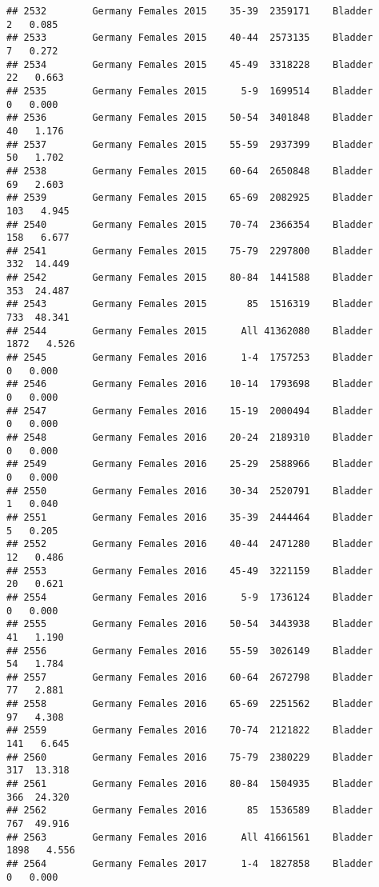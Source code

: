 \documentclass[
]{article}
\begin{document}
\begin{verbatim}
## 2532        Germany Females 2015    35-39  2359171    Bladder      2   0.085
## 2533        Germany Females 2015    40-44  2573135    Bladder      7   0.272
## 2534        Germany Females 2015    45-49  3318228    Bladder     22   0.663
## 2535        Germany Females 2015      5-9  1699514    Bladder      0   0.000
## 2536        Germany Females 2015    50-54  3401848    Bladder     40   1.176
## 2537        Germany Females 2015    55-59  2937399    Bladder     50   1.702
## 2538        Germany Females 2015    60-64  2650848    Bladder     69   2.603
## 2539        Germany Females 2015    65-69  2082925    Bladder    103   4.945
## 2540        Germany Females 2015    70-74  2366354    Bladder    158   6.677
## 2541        Germany Females 2015    75-79  2297800    Bladder    332  14.449
## 2542        Germany Females 2015    80-84  1441588    Bladder    353  24.487
## 2543        Germany Females 2015       85  1516319    Bladder    733  48.341
## 2544        Germany Females 2015      All 41362080    Bladder   1872   4.526
## 2545        Germany Females 2016      1-4  1757253    Bladder      0   0.000
## 2546        Germany Females 2016    10-14  1793698    Bladder      0   0.000
## 2547        Germany Females 2016    15-19  2000494    Bladder      0   0.000
## 2548        Germany Females 2016    20-24  2189310    Bladder      0   0.000
## 2549        Germany Females 2016    25-29  2588966    Bladder      0   0.000
## 2550        Germany Females 2016    30-34  2520791    Bladder      1   0.040
## 2551        Germany Females 2016    35-39  2444464    Bladder      5   0.205
## 2552        Germany Females 2016    40-44  2471280    Bladder     12   0.486
## 2553        Germany Females 2016    45-49  3221159    Bladder     20   0.621
## 2554        Germany Females 2016      5-9  1736124    Bladder      0   0.000
## 2555        Germany Females 2016    50-54  3443938    Bladder     41   1.190
## 2556        Germany Females 2016    55-59  3026149    Bladder     54   1.784
## 2557        Germany Females 2016    60-64  2672798    Bladder     77   2.881
## 2558        Germany Females 2016    65-69  2251562    Bladder     97   4.308
## 2559        Germany Females 2016    70-74  2121822    Bladder    141   6.645
## 2560        Germany Females 2016    75-79  2380229    Bladder    317  13.318
## 2561        Germany Females 2016    80-84  1504935    Bladder    366  24.320
## 2562        Germany Females 2016       85  1536589    Bladder    767  49.916
## 2563        Germany Females 2016      All 41661561    Bladder   1898   4.556
## 2564        Germany Females 2017      1-4  1827858    Bladder      0   0.000

\end{verbatim}
\end{document}
